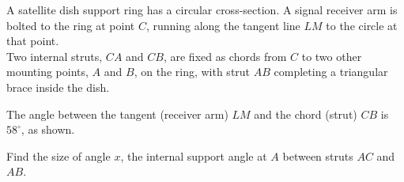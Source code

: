 \begin{question}
\noindent A satellite dish support ring has a circular cross-section. A signal receiver arm is bolted to the ring at point $C$, running along the tangent line $LM$ to the circle at that point.\\

Two internal struts, $CA$ and $CB$, are fixed as chords from $C$ to two other mounting points, $A$ and $B$, on the ring, with strut $AB$ completing a triangular brace inside the dish.

\noindent The angle between the tangent (receiver arm) $LM$ and the chord (strut) $CB$ is $58^\circ$, as shown.

\begin{center}
\end{center}

\noindent Find the size of angle $x$, the internal support angle at $A$ between struts $AC$ and $AB$.

\vspace{3cm}

\begin{flushright}
\end{flushright}
\end{question}